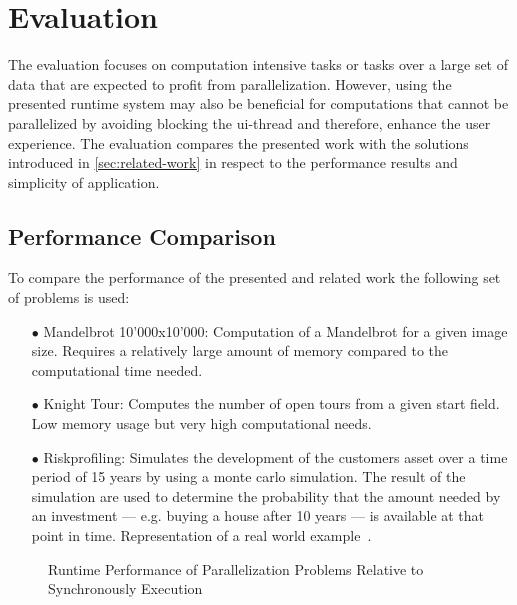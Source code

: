 \section{Evaluation}\label{sec:evaluation}
The evaluation focuses on computation intensive tasks or tasks over a large set of data that are expected to profit from parallelization. However, using the presented runtime system may also be beneficial for computations that cannot be parallelized by avoiding blocking the ui-thread and therefore, enhance the user experience. The evaluation compares the presented work with the solutions introduced in \cref{sec:related-work} in respect to the performance results and simplicity of application. 

\subsection{Performance Comparison}
To compare the performance of the presented and related work the following set of problems is used:

\begin{itemize}
	\item[$\bullet$] Mandelbrot 10'000x10'000: Computation of a Mandelbrot for a given image size. Requires a relatively large amount of memory compared to the computational time needed.
	\item[$\bullet$] Knight Tour: Computes the number of open tours from a given start field. Low memory usage but very high computational needs.
	\item[$\bullet$] Riskprofiling: Simulates the development of the customers asset over a time period of 15 years by using a monte carlo simulation. The result of the simulation are used to determine the probability that the amount needed by an investment --- e.g. buying a house after 10 years --- is available at that point in time. Representation of a real world example~\cite{Kwsoft2016}.
\end{itemize}

\begin{figure*}
		
	\caption{Runtime Performance of Parallelization Problems Relative to Synchronously Execution}
	\label{fig:runtime-performance}
\end{figure*}

